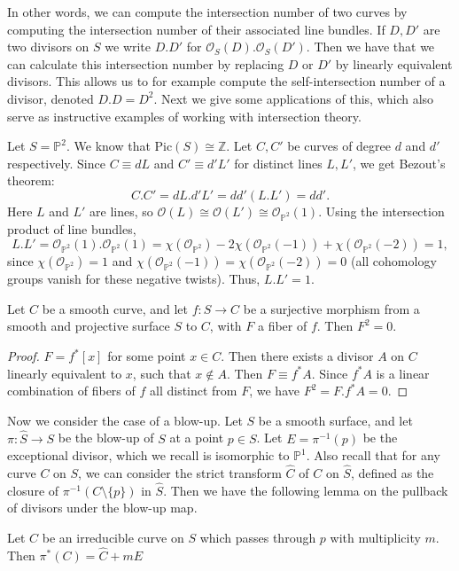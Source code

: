 In other words, we can compute the intersection number of two curves by computing the intersection number of their associated line bundles. If $D, D'$ are two divisors on $S$ we write $D.D'$ for $\mathcal{O}_S(D).\mathcal{O}_S(D')$. Then we have that we can calculate this intersection number by replacing $D$ or $D'$ by linearly equivalent divisors. This allows us to for example compute the self-intersection number of a divisor, denoted $D.D = D^2$. Next we give some applications of this, which also serve as instructive examples of working with intersection theory.

\begin{example}
    Let $S = \mathbb{P}^2$. We know that $\mathrm{Pic}(S) \cong \mathbb{Z}$. Let $C, C'$ be curves of degree $d$ and $d'$ respectively. Since $C \equiv dL$ and $C' \equiv d'L'$ for distinct lines $L, L'$, we get Bezout's theorem:
    \[C.C' = dL.d'L' = dd' (L.L') = dd'.\]
    Here $L$ and $L'$ are lines, so $\mathcal{O}(L)\cong\mathcal{O}(L')\cong\mathcal{O}_{\mathbb{P}^2}(1)$. Using the intersection product of line bundles,
    \[L.L' = \mathcal{O}_{\mathbb{P}^2}(1).\mathcal{O}_{\mathbb{P}^2}(1) = \chi(\mathcal{O}_{\mathbb{P}^2}) - 2\chi(\mathcal{O}_{\mathbb{P}^2}(-1)) + \chi(\mathcal{O}_{\mathbb{P}^2}(-2)) = 1,\]
    since $\chi(\mathcal{O}_{\mathbb{P}^2})=1$ and $\chi(\mathcal{O}_{\mathbb{P}^2}(-1))=\chi(\mathcal{O}_{\mathbb{P}^2}(-2))=0$ (all cohomology groups vanish for these negative twists). Thus, $L.L'=1$.
\end{example}

\begin{example}
    Let $C$ be a smooth curve, and let $f\colon S \to C$ be a surjective morphism from a smooth and projective surface $S$ to $C$, with $F$ a fiber of $f$. Then $F^2 = 0$.
\end{example}
\begin{proof}
    $F = f^*[x]$ for some point $x \in C$. Then there exists a divisor $A$ on $C$ linearly equivalent to $x$, such that $x \notin A$. Then $F \equiv f^*A$. Since $f^*A$ is a linear combination of fibers of $f$ all distinct from $F$, we have $F^2 = F.f^*A = 0$.
\end{proof}

Now we consider the case of a blow-up. Let $S$ be a smooth surface, and let $\pi\colon \hat{S} \to S$ be the blow-up of $S$ at a point $p \in S$. Let $E = \pi^{-1}(p)$ be the exceptional divisor, which we recall is isomorphic to $\mathbb{P}^1$. Also recall that for any curve $C$ on $S$, we can consider the strict transform $\hat{C}$ of $C$ on $\hat{S}$, defined as the closure of $\pi^{-1}(C \setminus \{p\})$ in $\hat{S}$. Then we have the following lemma on the pullback of divisors under the blow-up map.
\begin{lemma}\label{lem:strict}
    Let $C$ be an irreducible curve on $S$ which passes through $p$ with multiplicity $m$. Then $\pi^*(C) = \hat{C} + mE$
\end{lemma}

